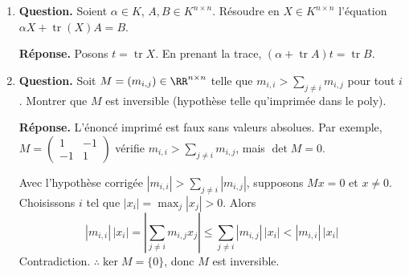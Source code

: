 \documentclass[12pt, a4paper]{article}
\begin{document}
\begin{enumerate}[label=4.\arabic*., start=60]
  \item \begin{minipage}[t]{\linewidth}\raggedright
\textbf{Question.} Soient $\alpha\in K$, $A,B\in K^{n\times n}$. Résoudre en $X\in K^{n\times n}$ l’équation $\alpha X+\operatorname{tr}(X)A=B$.
\par\smallskip
\textbf{Réponse.} Posons $t=\operatorname{tr}X$. En prenant la trace,
    $(\alpha+\operatorname{tr}A)t=\operatorname{tr}B$.
\end{minipage}

  \item \begin{minipage}[t]{\linewidth}\raggedright
\textbf{Question.} Soit $M=(m_{i,j})\in\RR^{n\times n}$ telle que $m_{i,i}>\sum_{j\neq i}m_{i,j}$ pour tout $i$. Montrer que $M$ est inversible (hypothèse telle qu’imprimée dans le poly).
\par\smallskip
\textbf{Réponse.} L'énoncé imprimé est faux sans valeurs absolues. Par exemple,
    $\displaystyle M=\begin{pmatrix}1&-1\\-1&1\end{pmatrix}$ vérifie $m_{i,i}>\sum_{j\neq i}m_{i,j}$, mais $\det M=0$.

    Avec l'hypothèse corrigée $|m_{i,i}|>\sum_{j\neq i}|m_{i,j}|$, supposons $Mx=0$ et $x\neq0$.
    Choisissons $i$ tel que $|x_i|=\max_j|x_j|>0$. Alors
    \[
      |m_{i,i}|\,|x_i|=\left|\sum_{j\neq i}m_{i,j}x_j\right|
      \leq\sum_{j\neq i}|m_{i,j}|\,|x_i|<|m_{i,i}|\,|x_i|
    \]
    Contradiction. $\therefore\ker M=\{0\}$, donc $M$ est inversible.
\end{minipage}


\end{enumerate}
\end{document}
